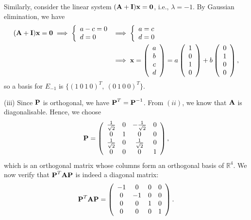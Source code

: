 \documentclass[12pt]{amsart}
\theoremstyle{plain}
\theoremstyle{definition}
\def\mb{\mathbb}
\def\bf{\textbf}
\newcommand{\RA}{\implies}
\begin{document}
Similarly, consider the linear system $(\bf A+\bf I)\bf x=\bf 0$, i.e., $\lambda=-1$. By Gaussian elimination, we have
\begin{align*}
	(\bf A+\bf I)\bf x=\bf 0\RA
	\left\{
	\begin{array}{l}
		a-c=0\\
		d=0
	\end{array}
	\right.
	&\implies
	\left\{
	\begin{array}{l}
		a=c\\
		d=0
	\end{array}
	\right.\\
	&\RA
	\bf x=
	\left(
	\begin{array}{c}
		a\\
		b\\
		c\\
		d
	\end{array}
	\right)=a\left(
	\begin{array}{c}
		1\\
		0\\
		1\\
		0
	\end{array}
	\right)+b\left(
	\begin{array}{c}
		0\\
		1\\
		0\\
		0
	\end{array}
	\right),
\end{align*}
so a basis for $E_{-1}$ is $\{(1\ 0\ 1\ 0)^T, \ (0\ 1\ 0\ 0)^T\}$.

(iii) Since $\bf P$ is orthogonal, we have $\bf P^T=\bf P^{-1}$. From $(ii)$, we know that $\bf A$ is diagonalisable. Hence, we choose
\begin{align*}
	\bf P=\left(
	\begin{array}{cccc}
		\frac1{\sqrt2} & 0 & -\frac1{\sqrt2} & 0\\
		0 & 1 & 0 & 0\\
		\frac1{\sqrt2} & 0 & \frac1{\sqrt2} & 0\\
		0 & 0 & 0 & 1\\
	\end{array}
	\right),
\end{align*}
which is an orthogonal matrix whose columns form an orthogonal basis of $\mb R^4$. We now verify that $\bf P^T\bf A\bf P$ is indeed a diagonal matrix:
\begin{align*}
	\bf P^T\bf A\bf P=\left(
	\begin{array}{cccc}
		-1 & 0 & 0 & 0\\
		0 & -1 & 0 & 0\\
		0 & 0 & 1 & 0\\
		0 & 0 & 0 & 1\\
	\end{array}
	\right).
\end{align*}
\end{document}
